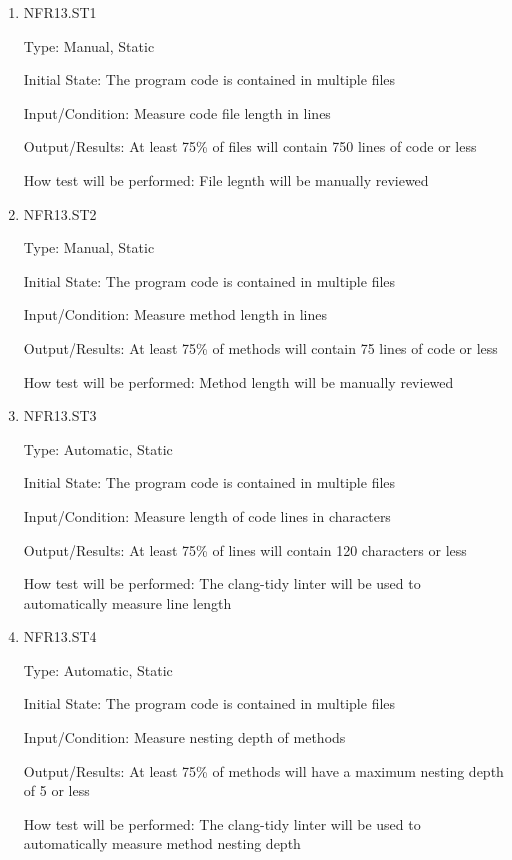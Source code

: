\documentclass[12pt, titlepage]{article}
\begin{document}
\begin{enumerate}

\item{NFR13.ST1\\}

Type: Manual, Static

Initial State: The program code is contained in multiple files

Input/Condition: Measure code file length in lines

Output/Results: At least 75\% of files will contain 750 lines of code or less

How test will be performed: File legnth will be manually reviewed

\item{NFR13.ST2\\}

Type: Manual, Static

Initial State: The program code is contained in multiple files

Input/Condition: Measure method length in lines

Output/Results: At least 75\% of methods will contain 75 lines of code or less

How test will be performed: Method length will be manually reviewed

\item{NFR13.ST3\\}

Type: Automatic, Static

Initial State: The program code is contained in multiple files

Input/Condition: Measure length of code lines in characters

Output/Results: At least 75\% of lines will contain 120 characters or less

How test will be performed: The clang-tidy linter will be used to automatically measure line length

\item{NFR13.ST4\\}

Type: Automatic, Static

Initial State: The program code is contained in multiple files

Input/Condition: Measure nesting depth of methods

Output/Results: At least 75\% of methods will have a maximum nesting depth of 5 or less

How test will be performed: The clang-tidy linter will be used to automatically measure method nesting depth

\end{enumerate}
\end{document}
